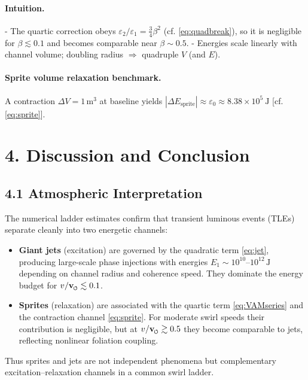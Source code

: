 \documentclass[reprint,aps,onecolumn,nofootinbib]{revtex4-2}
\newcommand{\swirlarrow}{%
    \mathchoice{\mkern-2mu\scriptstyle\boldsymbol{\circlearrowleft}}%
    {\mkern-2mu\scriptstyle\boldsymbol{\circlearrowleft}}%
    {\mkern-2mu\scriptscriptstyle\boldsymbol{\circlearrowleft}}%
    {\mkern-2mu\scriptscriptstyle\boldsymbol{\circlearrowleft}}%
}
\newcommand{\vswirl}{\mathbf{v}_{\swirlarrow}}
\newcommand{\Ce}{\vswirl}
\begin{document}
\paragraph{Intuition.}
    - The quartic correction obeys $\varepsilon_2/\varepsilon_1=\tfrac{3}{4}\beta^2$ (cf. \eqref{eq:quadbreak}), so it is negligible for $\beta\lesssim 0.1$ and becomes comparable near $\beta\sim 0.5$.
    - Energies scale linearly with channel volume; doubling radius $\Rightarrow$ quadruple $V$ (and $E$).

\paragraph{Sprite volume relaxation benchmark.}
    A contraction $\Delta V=1\,\mathrm{m^3}$ at baseline yields $|\Delta E_{\text{sprite}}| \approx \varepsilon_0 \approx 8.38\times 10^{5}\ \mathrm{J}$ [cf. \eqref{eq:sprite}].


\section*{4. Discussion and Conclusion}

\subsection*{4.1 Atmospheric Interpretation}

    The numerical ladder estimates confirm that transient luminous events
    (TLEs) separate cleanly into two energetic channels:

    \begin{itemize}
    \item \textbf{Giant jets} (excitation) are governed by the quadratic term
    \eqref{eq:jet}, producing large-scale phase injections with energies
    $E_1 \sim 10^{10}$--$10^{12}\,\mathrm{J}$ depending on channel radius
    and coherence speed. They dominate the energy budget for
    $v/\Ce \lesssim 0.1$.
    \item \textbf{Sprites} (relaxation) are associated with the quartic term
    \eqref{eq:VAMseries} and the contraction channel \eqref{eq:sprite}.
    For moderate swirl speeds their contribution is negligible, but at
    $v/\Ce \gtrsim 0.5$ they become comparable to jets, reflecting
    nonlinear foliation coupling.
    \end{itemize}

    Thus sprites and jets are not independent phenomena but
    complementary excitation--relaxation channels in a common swirl
    ladder.
\end{document}
